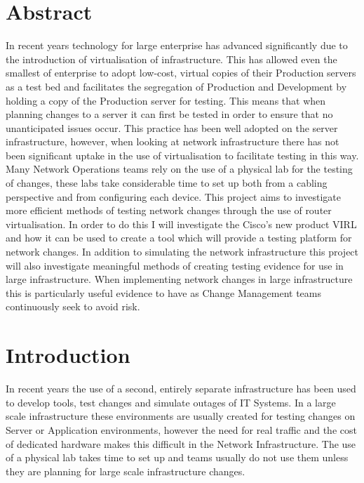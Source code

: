\documentclass[11pt]{report}
\begin{document}
\chapter*{Abstract}

In recent years technology for large enterprise has advanced significantly due to the introduction of virtualisation of infrastructure. This has allowed even the smallest of enterprise to adopt low-cost, virtual copies of their Production servers as a test bed and facilitates the segregation of Production and Development by holding a copy of the Production server for testing. This means that when planning changes to a server it can first be tested in order to ensure that no unanticipated issues occur. This practice has been well adopted on the server infrastructure, however, when looking at network infrastructure there has not been significant uptake in the use of virtualisation to facilitate testing in this way. Many Network Operations teams rely on the use of a physical lab for the testing of changes, these labs take considerable time to set up both from a cabling perspective and from configuring each device. This project aims to investigate more efficient methods of testing network changes through the use of router virtualisation. In order to do this I will investigate the Cisco's new product VIRL and how it can be used to create a tool which will provide a testing platform for network changes. In addition to simulating the network infrastructure this project will also investigate meaningful methods of creating testing evidence for use in large infrastructure. When implementing network changes in large infrastructure this is particularly useful evidence to have as Change Management teams continuously seek to avoid risk.

\pagebreak

\tableofcontents


\chapter{Introduction}
In recent years the use of a second, entirely separate infrastructure has been used to develop tools, test changes and simulate outages of IT Systems. In a large scale infrastructure these environments are usually created for testing changes on Server or Application environments, however the need for real traffic and the cost of dedicated hardware makes this difficult in the Network Infrastructure. The use of a physical lab takes time to set up and teams usually do not use them unless they are planning for large scale infrastructure changes.
\end{document}
